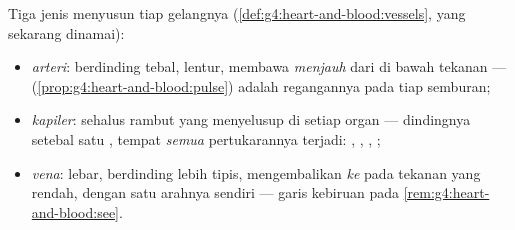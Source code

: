 \begin{definition}\label{def:g7:heart-and-circulation:vessels}
Tiga jenis  menyusun tiap gelangnya
(\cref{def:g4:heart-and-blood:vessels}, yang sekarang dinamai):
\begin{itemize}
  \item \emph{arteri}: berdinding tebal, lentur,
        membawa  \emph{menjauh} dari  di bawah tekanan ---
        (\cref{prop:g4:heart-and-blood:pulse}) adalah regangannya pada
        tiap semburan;
  \item \emph{kapiler}:  sehalus rambut yang
        menyelusup di setiap organ --- dindingnya setebal satu ,
        tempat \emph{semua} pertukarannya terjadi: , , , ;
  \item \emph{vena}: lebar, berdinding lebih tipis,
        mengembalikan  \emph{ke}  pada tekanan yang
        rendah, dengan  satu arahnya sendiri --- garis kebiruan
        pada \cref{rem:g4:heart-and-blood:see}.
\end{itemize}
\end{definition}

